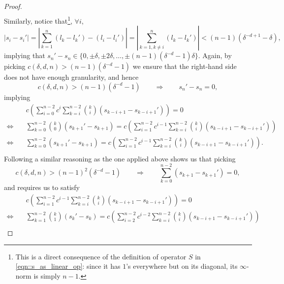 \begin{proof}
\begin{equation}
\begin{split}
\end{split}
\label{eqn::condition_on_sn_for_1to1}
\end{equation}
Similarly, notice that\footnote{This is a direct consequence of the definition of operator $S$ in \cref{eqn::s_as_linear_op}: since it has $1$'s everywhere but on its diagonal, its $\infty$-norm is simply $n-1$.}, $\forall i$,
\begin{equation}
    |s_i-s_i'|=\left|\sum_{k=1}^{n} (l_k-l_k') - (l_i-l_i')\right|=\left|\sum_{k=1,k\neq i}^{n} (l_k-l_k')\right|<(n-1)(\delta^{-d+1}-\delta),
\end{equation}
implying that $s_n'-s_n\in\{0,\pm\delta,\pm2\delta,\dots,\pm(n-1)(\delta^{-d}-1)\delta\}$. Again, by picking $c(\delta,d,n)>(n-1)(\delta^{-d}-1)$ we ensure that the right-hand side does not have enough granularity, and hence
\begin{equation}
    c(\delta,d,n)>(n-1)(\delta^{-d}-1) \qquad\Longrightarrow\qquad s_n'-s_n=0,  
    \label{eqn::conditions_on_c_for_1to1_0}
\end{equation}
implying
\begin{equation}
\begin{split}
    &c\left(\sum_{i=0}^{n-2}c^i\sum_{k=i}^{n-2}\binom{k}{i}(s_{k-i+1}-s_{k-i+1}')\right)=0\\
    \Longleftrightarrow\quad& \sum_{k=0}^{n-2}\binom{k}{0}(s_{k+1}'-s_{k+1}) = c\left(\sum_{i=1}^{n-2}c^{i-1}\sum_{k=i}^{n-2}\binom{k}{i}(s_{k-i+1}-s_{k-i+1}')\right)\\
    \Longleftrightarrow\quad& \sum_{k=0}^{n-2}(s_{k+1}'-s_{k+1}) = c\left(\sum_{i=1}^{n-2}c^{i-1}\sum_{k=i}^{n-2}\binom{k}{i}(s_{k-i+1}-s_{k-i+1}')\right).\\
\end{split}
\end{equation}
Following a similar reasoning as the one applied above shows us that picking
\begin{equation}
    c(\delta,d,n)>(n-1)^2(\delta^{-d}-1) \qquad\Longrightarrow\qquad \sum_{k=0}^{n-2}(s_{k+1}-s_{k+1}')=0,
\end{equation}
and requires us to satisfy
\begin{equation}
\begin{split}
    & c\left(\sum_{i=1}^{n-2}c^{i-1}\sum_{k=i}^{n-2}\binom{k}{i}(s_{k-i+1}-s_{k-i+1}')\right)=0\\
    \Longleftrightarrow\quad& \sum_{k=1}^{n-2}\binom{k}{1}(s_{k}'-s_{k}) = c\left(\sum_{i=2}^{n-2}c^{i-2}\sum_{k=i}^{n-2}\binom{k}{i}(s_{k-i+1}-s_{k-i+1}')\right)\\

\end{split}
\end{equation}
\end{proof}
